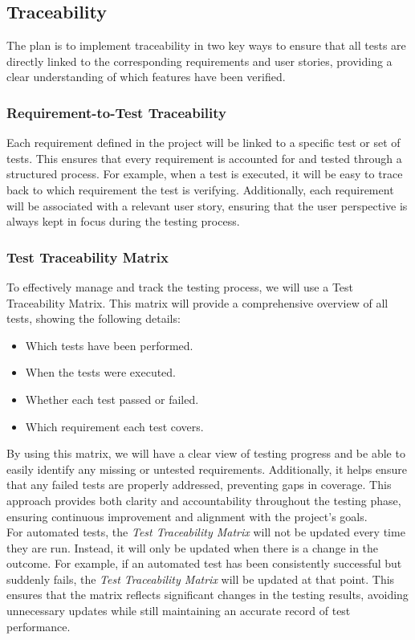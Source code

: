\documentclass{article}
\begin{document}
\subsection{Traceability}
The plan is to implement traceability in two key ways to ensure that all tests are directly linked to the corresponding requirements and user stories, providing a clear understanding of which features have been verified.

\subsubsection{Requirement-to-Test Traceability} Each requirement defined in the project will be linked to a specific test or set of tests. This ensures that every requirement is accounted for and tested through a structured process. For example, when a test is executed, it will be easy to trace back to which requirement the test is verifying. Additionally, each requirement will be associated with a relevant user story, ensuring that the user perspective is always kept in focus during the testing process.

\subsubsection{Test Traceability Matrix} To effectively manage and track the testing process, we will use a Test Traceability Matrix. This matrix will provide a comprehensive overview of all tests, showing the following details:

\begin{itemize}
    \item Which tests have been performed.
    \item When the tests were executed.
    \item Whether each test passed or failed.
    \item Which requirement each test covers.
\end{itemize}

By using this matrix, we will have a clear view of testing progress and be able to easily identify any missing or untested requirements. Additionally, it helps ensure that any failed tests are properly addressed, preventing gaps in coverage. This approach provides both clarity and accountability throughout the testing phase, ensuring continuous improvement and alignment with the project’s goals. \\

For automated tests, the \textit{Test Traceability Matrix} will not be updated every time they are run. Instead, it will only be updated when there is a change in the outcome. For example, if an automated test has been consistently successful but suddenly fails, the \textit{Test Traceability Matrix} will be updated at that point. This ensures that the matrix reflects significant changes in the testing results, avoiding unnecessary updates while still maintaining an accurate record of test performance.
\end{document}
